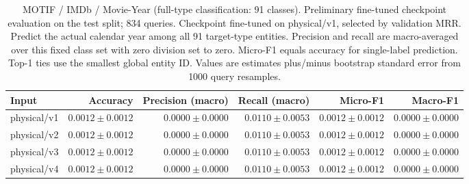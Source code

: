 \begin{table}[t]
\centering
\small
\begin{tabular}{lrrrrr}
\toprule
Input & Accuracy & Precision (macro) & Recall (macro) & Micro-F1 & Macro-F1 \\
\midrule
physical/v1 & $0.0012 \pm 0.0012$ & $0.0000 \pm 0.0000$ & $0.0110 \pm 0.0053$ & $0.0012 \pm 0.0012$ & $0.0000 \pm 0.0000$ \\
physical/v2 & $0.0012 \pm 0.0012$ & $0.0000 \pm 0.0000$ & $0.0110 \pm 0.0053$ & $0.0012 \pm 0.0012$ & $0.0000 \pm 0.0000$ \\
physical/v3 & $0.0012 \pm 0.0012$ & $0.0000 \pm 0.0000$ & $0.0110 \pm 0.0053$ & $0.0012 \pm 0.0012$ & $0.0000 \pm 0.0000$ \\
physical/v4 & $0.0012 \pm 0.0012$ & $0.0000 \pm 0.0000$ & $0.0110 \pm 0.0053$ & $0.0012 \pm 0.0012$ & $0.0000 \pm 0.0000$ \\
\bottomrule
\end{tabular}
\caption{MOTIF / IMDb / Movie-Year (full-type classification: 91 classes). Preliminary fine-tuned checkpoint evaluation on the test split; 834 queries. Checkpoint fine-tuned on physical/v1, selected by validation MRR. Predict the actual calendar year among all 91 target-type entities. Precision and recall are macro-averaged over this fixed class set with zero division set to zero. Micro-F1 equals accuracy for single-label prediction. Top-1 ties use the smallest global entity ID. Values are estimates plus/minus bootstrap standard error from 1000 query resamples.}
\label{tab:motif-movie_year-classification}
\end{table}
